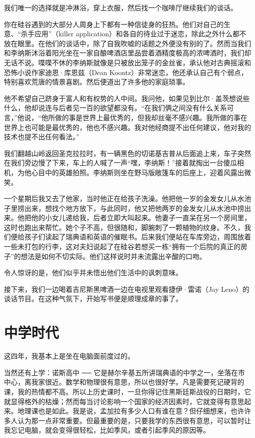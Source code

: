 我们唯一的选择就是冲淋浴，穿上衣服，然后找一个咖啡厅继续我们的谈话。

你在硅谷遇到的大部分人周身上下都有一种信徒身的狂热。他们对自己的生意、“杀手应用”（killer application）和各自的待业过于迷恋，除此之外什么都不放在眼里。在他们的谈话中，除了自我吹嘘的话题之外便没有别的了。然而当我们和李纳斯沐浴着阳光坐在一家自酿啤酒店里品尝着酒精度极高的浓啤酒时，我们却无话不说。喋喋不休的李纳斯就像是只被放出笼子的金丝雀，承认他对古典摇滚和恐怖小说作家迪恩·库恩兹（Dean Koontz）非常迷恋，他还承认自己有个弱点，特别喜欢荒唐的情景喜剧。然后便道出了许多他的家庭琐事。

他不希望自己跻身于富人和有权势的人中间。我问他，如果见到比尔·盖茨想说些什么，他却说连与后者见一百的欲望都没有。“在我们俩之间没有什么关系可言，”他说，“他所做的事是世界上最优秀的，但我却丝毫不感兴趣。我所做的事在世界上也可能是最优秀的，他也不感兴趣。我对他经商提不出任何建议，他对我的技术也提不出任何看法。”

我们翻越山岭返回圣克拉拉时，有一辆黑色的切诺基吉普从后面追上来，车子突然在我们旁边慢了下来，车上的人喊了一声“嘿，李纳斯！”接着就掏出一台傻瓜相机，为他心目中的英雄拍照。李纳斯则坐在野马版敞篷车的后座上，迎着风露出微笑。

一个星期后我又去了他家，当时他正在给孩子洗澡。他把他一岁的金发女儿从水池子里捞出来，想找个地方放下，与此同时，他又把他两岁的金发女儿从水池中捞出来。他把他的小女儿递给我，后者立即大叫起来。他妻子一直呆在另一个房间里，这时也跑出来帮忙。她个子不高，但很随和，脚腕刺了一颗植物的纹身。不久，我们便给孩子们读起了瑞典语和英语的催眠书。后来我们便站在车库旁边，周围放着一些未打包的行李，这对夫妇说起了在硅谷若想买一栋“拥有一个后院的真正的房子”的想法是如何不切实际。他们这样说时并未流露出辛酸的口吻。

令人惊讶的是，他们似乎并未悟出他们生活中的讽刺意味。

接下来，我们一边喝着吉尼斯黑啤酒一边在电视里观看捷伊·雷诺（Jay Leno）的谈话节目。在这种气氛下，开始写书便是顺理成章的事了。

 
\section{中学时代}

这四年，我基本上是坐在电脑面前度过的。

当然还有上学：诺斯高中 ── 它是赫尔辛基五所讲瑞典语的中学之一，坐落在市中心，离我家很近。数学和物理很有意思，所以也很好学。凡是需要死记硬背的课，我的热情都不高。所以上历史课时，一旦你得记住黑斯廷斯战役的日期时，它就显得格外的枯燥；然而每当讨论影响一个国家的经济因素时，它就变得有意思起来。地理课也是如此。我是说，孟加拉有多少人口有谁在意？但仔细想来，也许许多人认为那一点非常重要。但最重要的是，只要我学的东西很有意思，可以暂时让我忘记电脑，就会变得很轻松，比如季风，或者引起季风的原因等。

